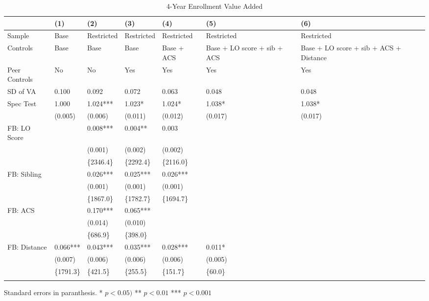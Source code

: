 \begin{table}[tbp] \centering
{}

\caption{4-Year Enrollment Value Added}
{\footnotesize
\begin{tabularx}{\linewidth}{lCCCCCC}

\toprule
&{(1)}&{(2)}&{(3)}&{(4)}&{(5)}&{(6)} \tabularnewline
\midrule \addlinespace[\belowrulesep]
Sample&Base&Restricted&Restricted&Restricted&Restricted&Restricted \tabularnewline
Controls&Base&Base&Base&Base + ACS&Base + LO score + sib + ACS&Base + LO score + sib + ACS + Distance \tabularnewline
Peer Controls&No&No&Yes&Yes&Yes&Yes \tabularnewline
\midrule SD of VA&0.100&0.092&0.072&0.063&0.048&0.048 \tabularnewline
Spec Test&1.000&1.024***&1.023*&1.024*&1.038*&1.038* \tabularnewline
&(0.005)&(0.006)&(0.011)&(0.012)&(0.017)&(0.017) \tabularnewline
FB: LO Score&&0.008***&0.004**&0.003&& \tabularnewline
&&(0.001)&(0.002)&(0.002)&& \tabularnewline
&&\{2346.4\}&\{2292.4\}&\{2116.0\}&& \tabularnewline
FB: Sibling&&0.026***&0.025***&0.026***&& \tabularnewline
&&(0.001)&(0.001)&(0.001)&& \tabularnewline
&&\{1867.0\}&\{1782.7\}&\{1694.7\}&& \tabularnewline
FB: ACS&&0.170***&0.065***&&& \tabularnewline
&&(0.014)&(0.010)&&& \tabularnewline
&&\{686.9\}&\{398.0\}&&& \tabularnewline
FB: Distance&0.066***&0.043***&0.035***&0.028***&0.011*& \tabularnewline
&(0.007)&(0.006)&(0.006)&(0.006)&(0.005)& \tabularnewline
&\{1791.3\}&\{421.5\}&\{255.5\}&\{151.7\}&\{60.0\}& \tabularnewline
\bottomrule \addlinespace[\belowrulesep]

\end{tabularx}
\begin{flushleft}
\footnotesize Standard errors in paranthesis. * \(p<0.05)\) ** \(p<0.01\) *** \(p<0.001\)
\end{flushleft}
}
\end{table}
